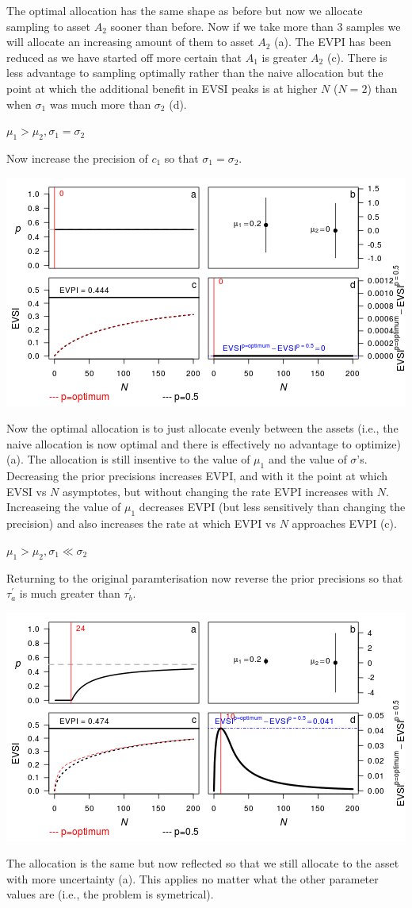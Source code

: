 The optimal allocation has the same shape as before but now we allocate
sampling to asset \(A_2\) sooner than before. Now if we take more than 3
samples we will allocate an increasing amount of them to asset \(A_2\)
(a). The EVPI has been reduced as we have started off more certain that
\(A_1\) is greater \(A_2\) (c). There is less advantage to sampling
optimally rather than the naive allocation but the point at which the
additional benefit in EVSI peaks is at higher \(N\) (\(N=2\)) than when
\(\sigma_1\) was much more than \(\sigma_2\) (d).

\textbf{\(\mu_1 > \mu_2, \sigma_1 = \sigma_2\)}

Now increase the precision of \(c_1\) so that \(\sigma_1 = \sigma_2\).

\includegraphics{figure/unnamed-chunk-6-1.png} \clearpage

Now the optimal allocation is to just allocate evenly between the assets
(i.e., the naive allocation is now optimal and there is effectively no
advantage to optimize) (a). The allocation is still insentive to the
value of \(\mu_1\) and the value of \(\sigma\)'s. Decreasing the prior
precisions increases EVPI, and with it the point at which EVSI vs \(N\)
asymptotes, but without changing the rate EVPI increases with \(N\).
Increaseing the value of \(\mu_1\) decreases EVPI (but less sensitively
than changing the precision) and also increases the rate at which EVPI
vs \(N\) approaches EVPI (c).

\textbf{\(\mu_1 > \mu_2, \sigma_1 \ll \sigma_2\)}

Returning to the original paramterisation now reverse the prior
precisions so that \(\tau^\prime_a\) is much greater than
\(\tau^\prime_b\).

\includegraphics{figure/unnamed-chunk-7-1.png} \clearpage

The allocation is the same but now reflected so that we still allocate
to the asset with more uncertainty (a). This applies no matter what the
other parameter values are (i.e., the problem is symetrical).

\captionsetup{labelformat=default}
